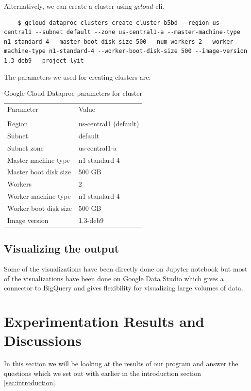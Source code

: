 \documentclass[journal,twoside,web]{ieeecolor}
\begin{document}
\newpage

Alternatively, we can create a cluster using $gcloud$ cli.

\begin{lstlisting}
    $ gcloud dataproc clusters create cluster-b5bd --region us-central1 --subnet default --zone us-central1-a --master-machine-type n1-standard-4 --master-boot-disk-size 500 --num-workers 2 --worker-machine-type n1-standard-4 --worker-boot-disk-size 500 --image-version 1.3-deb9 --project lyit
\end{lstlisting}

The parameters we used for creating clusters are:
\begin{table}[h]
    \caption{Google Cloud Dataproc parameters for cluster}
    \label{tab:parameters}
	\centering
    \begin{tabular}{l l}
    \toprule
    \multirow{1}{*}{Parameter} & \multirow{1}{*}{Value} \\ 
    & \\ \midrule
    Region & us-central1 (default) \\ \midrule
    Subnet & default \\ \midrule
    Subnet zone & us-central1-a \\ \midrule
    Master machine type & n1-standard-4 \\ \midrule
    Master boot disk size & 500 GB \\ \midrule
    Workers & 2 \\ \midrule
    Worker machine type & n1-standard-4 \\ \midrule
    Worker boot disk size & 500 GB \\ \midrule
    Image version & 1.3-deb9 \\
    \bottomrule
    \end{tabular}
\end{table}

\subsection{Visualizing the output}
Some of the visualizations have been directly done on Jupyter notebook but most of the visualizations have been done on Google Data Studio which gives a connector to BigQuery and gives flexibility for visualizing large volumes of data.

\section{Experimentation Results and Discussions}
\label{sec:discussion}
In this section we will be looking at the results of our program and answer the questions which we set out with earlier in the introduction section \ref{sec:introduction}.
\end{document}
